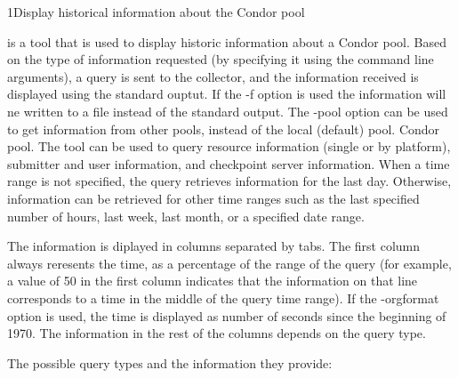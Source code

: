 \begin{ManPage}{}{1}{Display historical information about the Condor pool}
\label{man-condor-stats}
\Synopsis {}

\Description
{} is a tool that is used to display historic information about 
a Condor pool. Based on the type of information requested (by specifying
it using the command line arguments), a query is sent to the collector,
and the information received is displayed using the standard ouptut. If
the -f option is used the information will ne written to a file instead of
the standard output. The -pool option can be used to get information from 
other pools, instead of the local (default) pool.
Condor pool.  The  tool can be used to query resource 
information (single or by platform), submitter and user information, and checkpoint server information.
When a time range is not specified, the query retrieves information for the last
day. Otherwise, information can be retrieved for other time ranges such as the last
specified number of hours, last week, last month, or a specified date range.

The information is diplayed in columns separated by tabs. The first column always reresents
the time, as a percentage of the range of the query (for example, a value of 50 in the first 
column indicates that the information on that line corresponds to a time in the middle of the
query time range). If the -orgformat option is used, the time is displayed as number of seconds
since the beginning of 1970.
The information in the rest of the columns depends on the query type.

The possible query types and the information they provide:


\end{ManPage}
